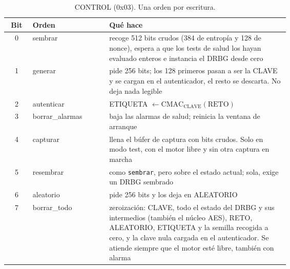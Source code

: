 \begin{table}[htbp]
\centering\small
\caption{CONTROL (0x03). Una orden por escritura.}
\label{tab:app_control}
\begin{tabular}{@{}cl>{\raggedright\arraybackslash}p{0.64\linewidth}@{}}
\toprule
Bit & Orden & Qué hace \\
\midrule
0 & sembrar & recoge 512 bits crudos (384 de entropía y 128 de nonce),
  espera a que los tests de salud los hayan evaluado enteros e instancia el
  \ac{DRBG} desde cero \\
1 & generar & pide 256 bits; los 128 primeros pasan a ser la CLAVE y se
  cargan en el autenticador, el resto se descarta. No deja nada legible \\
2 & autenticar & ETIQUETA $\leftarrow \mathrm{CMAC}_{\text{CLAVE}}(\text{RETO})$ \\
3 & borrar\_alarmas & baja las alarmas de salud; reinicia la ventana de
  arranque \\
4 & capturar & llena el búfer de captura con bits crudos. Solo en modo test,
  con el motor libre y sin otra captura en marcha \\
5 & resembrar & como \texttt{sembrar}, pero sobre el estado actual; sola,
  exige un \ac{DRBG} sembrado \\
6 & aleatorio & pide 256 bits y los deja en ALEATORIO \\
7 & borrar\_todo & zeroización: CLAVE, todo el estado del \ac{DRBG} y sus
  intermedios (también el núcleo \ac{AES}), RETO, ALEATORIO, ETIQUETA y la
  semilla recogida a cero, y la clave nula cargada en el autenticador. Se
  atiende siempre que el motor esté libre, también con alarma \\
\bottomrule
\end{tabular}
\end{table}

